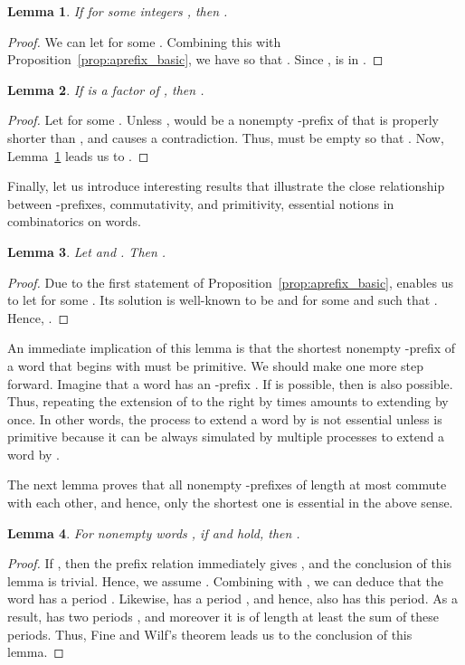 \documentclass{article}
\theoremstyle{plain}
\newtheorem{lemma}{Lemma}
\theoremstyle{remark}
\begin{document}
\begin{lemma}\label{lem:suf_relation_aprefs}
	If  for some integers , then . 
\end{lemma}
\begin{proof}
	We can let  for some . 
	Combining this with Proposition~\ref{prop:aprefix_basic}, we have  so that . 
	Since ,  is in . 
\end{proof}

\begin{lemma}\label{lem:factor_relation_shortests}
	If  is a factor of , then . 
\end{lemma}
\begin{proof}
	Let  for some . 
	Unless ,  would be a nonempty -prefix of  that is properly shorter than , and causes a contradiction. 
	Thus,  must be empty so that . 
	Now, Lemma~\ref{lem:suf_relation_aprefs} leads us to . 
\end{proof}

Finally, let us introduce interesting results that illustrate the close relationship between -prefixes, commutativity, and primitivity, essential notions in combinatorics on words. 

\begin{lemma}\label{lem:primitive_apref}
	Let  and . 
	Then . 
\end{lemma}
\begin{proof}
	Due to the first statement of Proposition~\ref{prop:aprefix_basic},  enables us to let  for some . 
	Its solution is well-known to be  and  for some  and  such that . 
	Hence, . 
\end{proof}

An immediate implication of this lemma is that the shortest nonempty -prefix of a word that begins with  must be primitive. 
We should make one more step forward. 
Imagine that a word  has an -prefix . 
If  is possible, then  is also possible. 
Thus, repeating the extension of  to the right by   times amounts to extending  by  once. 
In other words, the process to extend a word by  is not essential unless  is primitive because it can be always simulated by multiple processes to extend a word by . 

The next lemma proves that all nonempty -prefixes of length at most  commute with each other, and hence, only the shortest one is essential in the above sense. 

\begin{lemma}
	For nonempty words , if  and  hold, then . 
\end{lemma}
\begin{proof}
	If , then the prefix relation immediately gives , and the conclusion of this lemma is trivial. 
	Hence, we assume . 
	Combining  with , we can deduce that the word  has a period . 
	Likewise,  has a period , and hence,  also has this period. 
	As a result,  has two periods , and moreover it is of length at least the sum of these periods. 
	Thus, Fine and Wilf's theorem \cite{ChKa97, FiWi65} leads us to the conclusion of this lemma. 
\end{proof}
\end{document}
